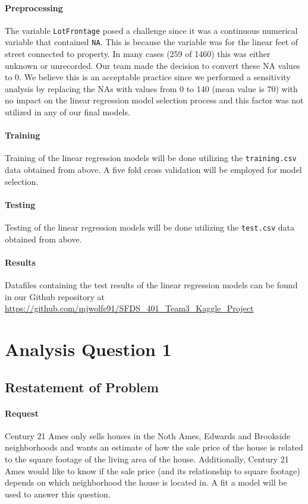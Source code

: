 \documentclass[11pt]{scrartcl} %
\begin{document}
\paragraph{Preprocessing} The variable \texttt{LotFrontage} posed a challenge since it was a continuous numerical variable that contained \texttt{NA}. This is because the variable was for the linear feet of street connected to property. In many cases (259 of 1460) this was either unknown or unrecorded. Our team made the decision to convert these NA values to 0. We believe this is an acceptable practice since we performed a sensitivity analysis by replacing the NAs with values from 0 to 140 (mean value is 70) with no impact on the linear regression model selection process and this factor was not utilized in any of our final models.
\paragraph{Training} Training of the linear regression models will be done utilizing the \texttt{training.csv} data obtained from above. A five fold cross validation will be employed for model selection. 
\paragraph{Testing} Testing of the linear regression models will be done utilizing the \texttt{test.csv} data obtained from above.
\paragraph{Results} Datafiles containing the test results of the linear regression models can be found in our Github repository at \href{https://github.com/mjwolfe91/SFDS_401_Team3_Kaggle_Project}{https://github.com/mjwolfe91/SFDS\_401\_Team3\_Kaggle\_Project}\\
			





\section{Analysis Question 1}
\subsection{Restatement of Problem}
\paragraph{Request} Century 21 Ames only sells houses in the Noth Ames, Edwards and Brookside neighborhoods and wants an estimate of how the sale price of the house is related to the square footage of the living area of the house. Additionally, Century 21 Ames would like to know if the sale price (and its relationship to square footage) depends on which neighborhood the house is located in. A fit a model will be used to answer this question.
\end{document}
